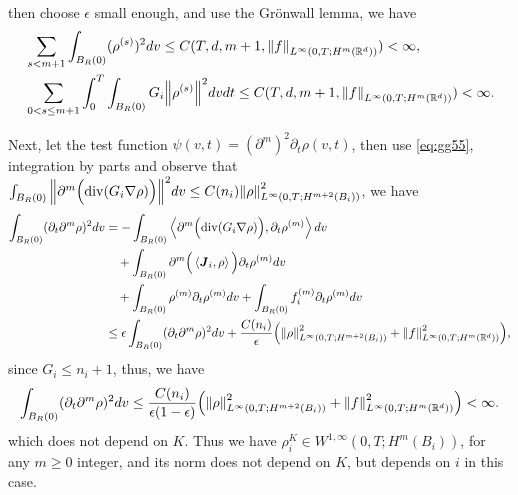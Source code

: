 \documentclass[a4paper, 11pt]{article}
\newcommand{\inner}[2]{\left< #1 , #2 \right>}
\theoremstyle{plain}
\theoremstyle{remark}
\theoremstyle{definition}
\renewcommand{\div}{\mathrm{div}}
\newcommand{\intt}{\int_0^T}
\newcommand{\intr}{\int_{B_R(0)}}
\newcommand{\J}{\boldsymbol{J}}
\begin{document}
	then choose $\epsilon$ small enough, and use the Gr\"onwall lemma, we have
	\begin{eqnarray}
		&\sum_{s<m+1}\intr(\rho^{(s)})^2dv\leq C(T,d,m+1,\norm{f}_{L^{\infty}(0,T;H^{m}(\mathbb{R}^d))})<\infty,\label{eq:g89}\\
		&\sum_{0<s\leq m+1}\intt\intr G_i\norm{\rho^{(s)}}^2dvdt\leq C(T,d,m+1,\norm{f}_{L^{\infty}(0,T;H^{m}(\mathbb{R}^d))})<\infty.\label{eq:g90}
	\end{eqnarray}



	Next, let the test function $\psi(v,t)=(\partial^{m})^2\partial_t\rho(v,t)$, then use \eqref{eq:gg55}, integration by parts and observe that $\intr\norm{\partial^m\Big(\div(G_i\nabla\rho)\Big)}^2dv\leq C(n_i)\norm{\rho}^2_{L^{\infty}(0,T;H^{m+2}(B_i))}$, we have
		\begin{equation}\label{eq:g85}
			\begin{aligned}
				\intr(\partial_t\partial^m\rho)^2dv&=-\intr\inner{\partial^m\Big(\div(G_i\nabla\rho)\Big)}{\partial_t\rho^{(m)}}dv\\
				&\quad+\intr\partial^m\Big(\inner{\J_i}{\rho}\Big)\partial_t\rho^{(m)}dv\\
				&\quad+\intr\rho^{(m)}\partial_t\rho^{(m)}dv+\intr f_i^{(m)}\partial_t\rho^{(m)}dv\\
				&\leq \epsilon\intr(\partial_t\partial^m\rho)^2dv+\frac{C(n_i)}{\epsilon}\Big(\norm{\rho}^2_{L^{\infty}(0,T;H^{m+2}(B_i))}+\norm{f}^2_{L^{\infty}(0,T;H^m(\mathbb{R}^d))}\Big),
			\end{aligned}
		\end{equation}
		since $G_i\leq n_i+1$, thus, we have
		\begin{equation}\label{eq:gg106}
			\intr(\partial_t\partial^m\rho)^2dv\leq \frac{C(n_i)}{\epsilon(1-\epsilon)}\Big(\norm{\rho}^2_{L^{\infty}(0,T;H^{m+2}(B_i))}+\norm{f}^2_{L^{\infty}(0,T;H^{m}(\mathbb{R}^d))}\Big)<\infty.
		\end{equation}
		which does not depend on $K$. Thus we have $\rho^K_i\in W^{1,\infty}(0,T;H^{m}(B_i))$, for any $m\geq 0$ integer, and its norm does not depend on $K$, but depends on $i$ in this case.
\end{document}

